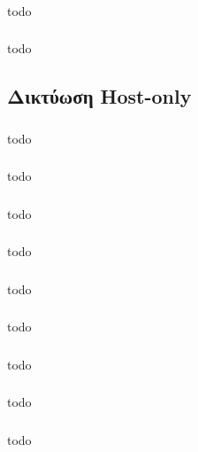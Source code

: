 \documentclass[a4paper, 12pt]{article}
\begin{document}
		\subsubsection{}
			todo

		\subsubsection{}
			todo

	\subsection{Δικτύωση Host-only}

		\subsubsection{}
			todo

		\subsubsection{}
			todo

		\subsubsection{}
			todo

		\subsubsection{}
			todo

		\subsubsection{}
			todo

		\subsubsection{}
			todo

		\subsubsection{}
			todo

		\subsubsection{}
			todo

		\subsubsection{}
			todo
\end{document}

